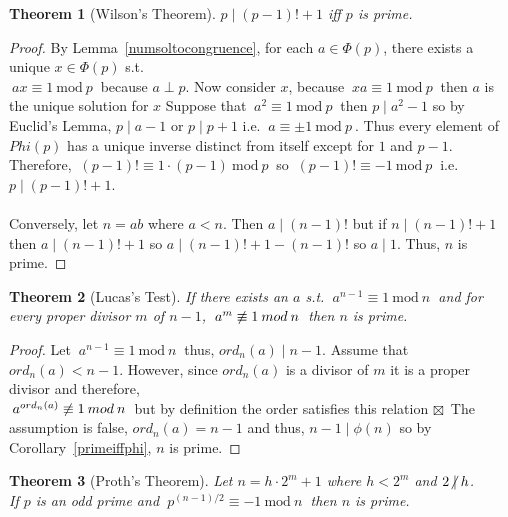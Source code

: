 \documentclass[12pt]{extarticle}
\newcommand{\cont}{$\boxtimes$}
\newcommand{\divides}{\mid}
\newcommand{\ndivides}{\centernot \mid}
\newtheorem{theorem}{Theorem}[section]
\renewcommand{\mod}[3]{\: #1 \equiv #2 \: \mathrm{mod} \: #3 \:}
\newcommand{\nmod}[3]{\: #1 \centernot \equiv #2 \: mod \: #3 \:}
\begin{document}
\begin{theorem}[Wilson's Theorem]
$p \divides (p - 1)! + 1$ iff $p$ is prime.
\end{theorem}

\begin{proof}
By Lemma~\ref{numsoltocongruence}, for each $a \in \Phi(p)$, there exists a unique $x \in \Phi(p)$ s.t. \\ $\mod{ax}{1}{p}$ because $a \perp p$. Now consider $x$, because $\mod{xa}{1}{p}$ then $a$ is the unique solution for $x$ Suppose that $\mod{a^2}{1}{p}$ then $p \divides a^2-1$ so by Euclid's Lemma, $p \divides a-1$ or $p \divides p+1$ i.e. $\mod{a}{\pm 1}{p}$. Thus every element of $Phi(p)$ has a unique inverse distinct from itself except for $1$ and $p-1$. Therefore, $\mod{(p-1)!}{1 \cdot (p-1)}{p}$ so $\mod{(p-1)!}{-1}{p}$ i.e. $p \divides (p-1)! + 1$. \\\\
Conversely, let $n = ab$ where $a < n$. Then $a \divides (n-1)!$ but if $n \divides (n-1)! + 1$ then $a \divides (n-1)! + 1$ so $a \divides (n-1)!  + 1 - (n-1)!$ so $a \divides 1$. Thus, $n$ is prime. 
\end{proof}

\begin{theorem}[Lucas's Test]
If there exists an $a$ s.t. $\mod{a^{n-1}}{1}{n}$ and for every proper divisor $m$ of $n-1$, $\nmod{a^m}{1}{n}$ then $n$ is prime.
\end{theorem}

\begin{proof}
Let $\mod{a^{n-1}}{1}{n}$ thus, $ord_n(a) \divides n - 1$. Assume that $ord_n(a) < n - 1$. However, since $ord_n(a)$ is a divisor of $m$ it is a proper divisor and therefore, \\ $\nmod{a^{ord_n(a)}}{1}{n}$ but by definition the order satisfies this relation \cont\ The assumption is false, $ord_n(a) = n - 1 $ and thus, $n - 1 \divides \phi (n)$ so by Corollary~\ref{primeiffphi}, $n$ is prime. 
\end{proof}

\begin{theorem}[Proth's Theorem]
Let $n = h \cdot 2^m + 1$ where $h < 2^m$ and $2 \ndivides h$. \\ If $p$ is an odd prime and $\mod{p^{(n-1)/2}}{-1}{n}$ then $n$ is prime.  
\end{theorem}
\end{document}

